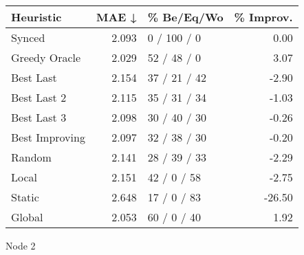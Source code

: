 \begin{tabular}{lrlr}
\toprule
\textbf{Heuristic} & \textbf{MAE ↓} & \textbf{\% Be/Eq/Wo} & \textbf{\% Improv.} \\
\midrule
            Synced &          2.093 &          0 / 100 / 0 &                0.00 \\
     Greedy Oracle &          2.029 &          52 / 48 / 0 &                3.07 \\
         Best Last &          2.154 &         37 / 21 / 42 &               -2.90 \\
       Best Last 2 &          2.115 &         35 / 31 / 34 &               -1.03 \\
       Best Last 3 &          2.098 &         30 / 40 / 30 &               -0.26 \\
    Best Improving &          2.097 &         32 / 38 / 30 &               -0.20 \\
            Random &          2.141 &         28 / 39 / 33 &               -2.29 \\
             Local &          2.151 &          42 / 0 / 58 &               -2.75 \\
            Static &          2.648 &          17 / 0 / 83 &              -26.50 \\
            Global &          2.053 &          60 / 0 / 40 &                1.92 \\
\bottomrule
\end{tabular}
\caption{Node 2}
\label{tab:hr_non_lr05_le2_bs4_2}
